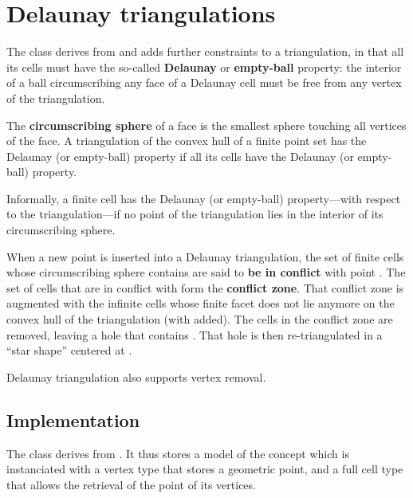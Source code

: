 {{%

\section{Delaunay triangulations}%

The class  derives from
 and adds further constraints to a
triangulation, in that all its cells must have the so-called
\textbf{Delaunay} or \textbf{empty-ball} property: the interior of a ball
circumscribing any face of a Delaunay cell must be free from any vertex
of the triangulation.

The \textbf{circumscribing sphere} of a face  is the smallest sphere
touching all vertices of the face. A triangulation of the convex
hull of a finite point set has the Delaunay (or empty-ball) property if all
its cells have the Delaunay (or empty-ball) property.

Informally, a finite cell has the Delaunay (or empty-ball) property---with
respect to the triangulation---if no point of the triangulation lies in the interior of
its circumscribing sphere.

When a new point  is inserted into a Delaunay triangulation, the set of
finite cells whose circumscribing sphere contains  are said to
\textbf{be in conflict} with point . The set of cells that are in
conflict with  form the \textbf{conflict zone}. That conflict zone is
augmented with the infinite cells whose finite facet does not lie
anymore on the convex hull of the triangulation (with  added). The cells
in the conflict zone are removed, leaving a hole that contains . That
hole is then re-triangulated in a ``star shape'' centered at .

Delaunay triangulation also supports vertex removal.


\subsection{Implementation}

The class  derives from
. It thus stores a model  of
the concept  which is instanciated with a vertex
type that stores a geometric point, and a full cell type that allows the
retrieval of the point of its vertices.

}}
